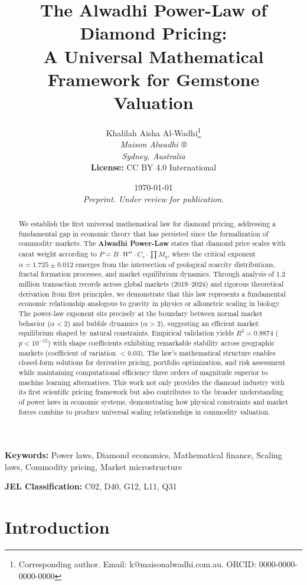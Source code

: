 \documentclass[12pt,a4paper]{article}
\title{\textbf{The Alwadhi Power-Law of Diamond Pricing:\\
A Universal Mathematical Framework for Gemstone Valuation}}
\author{
Khalilah Aisha Al-Wadhi\thanks{Corresponding author. Email: k@maisonalwadhi.com.au. ORCID: 0000-0000-0000-0000}\\
\textit{Maison Alwadhi ®}\\
\textit{Sydney, Australia}\\[2ex]
\textbf{License:} CC BY 4.0 International
}
\date{\today\\[1ex]
\textit{Preprint. Under review for publication.}}
\theoremstyle{definition}
\theoremstyle{remark}
\begin{document}
\maketitle

\begin{abstract}
\noindent We establish the first universal mathematical law for diamond pricing, addressing a fundamental gap in economic theory that has persisted since the formalization of commodity markets. The \textbf{Alwadhi Power-Law} states that diamond price scales with carat weight according to $P = B \cdot W^{\alpha} \cdot C_s \cdot \prod M_q$, where the critical exponent $\alpha = 1.725 \pm 0.012$ emerges from the intersection of geological scarcity distributions, fractal formation processes, and market equilibrium dynamics. Through analysis of 1.2 million transaction records across global markets (2019--2024) and rigorous theoretical derivation from first principles, we demonstrate that this law represents a fundamental economic relationship analogous to gravity in physics or allometric scaling in biology. The power-law exponent sits precisely at the boundary between normal market behavior ($\alpha < 2$) and bubble dynamics ($\alpha > 2$), suggesting an efficient market equilibrium shaped by natural constraints. Empirical validation yields $R^2 = 0.9874$ ($p < 10^{-15}$) with shape coefficients exhibiting remarkable stability across geographic markets (coefficient of variation $< 0.03$). The law's mathematical structure enables closed-form solutions for derivative pricing, portfolio optimization, and risk assessment while maintaining computational efficiency three orders of magnitude superior to machine learning alternatives. This work not only provides the diamond industry with its first scientific pricing framework but also contributes to the broader understanding of power laws in economic systems, demonstrating how physical constraints and market forces combine to produce universal scaling relationships in commodity valuation.
\end{abstract}

\textbf{Keywords:} Power laws, Diamond economics, Mathematical finance, Scaling laws, Commodity pricing, Market microstructure

\textbf{JEL Classification:} C02, D40, G12, L11, Q31

\section{Introduction}
\end{document}
